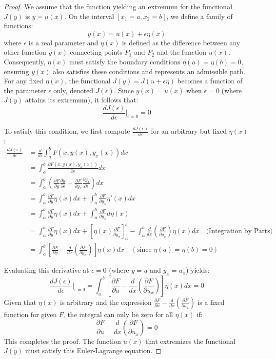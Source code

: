\documentclass[../main.tex]{subfiles}
\begin{document}
\begin{proof}
    
We assume that the function yielding an extremum for the functional $J(y)$ is $y = u(x)$. On the interval $[x_1 = a, x_2 = b]$, we define a family of functions:
$$
y(x) = u(x) + \epsilon \eta(x)
$$
where $\epsilon$ is a real parameter and $\eta(x)$ is defined as the difference between any other function $y(x)$ connecting points $P_1$ and $P_2$ and the function $u(x)$. Consequently, $\eta(x)$ must satisfy the boundary conditions $\eta(a) = \eta(b) = 0$, ensuring $y(x)$ also satisfies these conditions and represents an admissible path. For any fixed $\eta(x)$, the functional $J(y) = J(u + \epsilon\eta)$ becomes a function of the parameter $\epsilon$ only, denoted $J(\epsilon)$. Since $y(x) = u(x)$ when $\epsilon=0$ (where $J(y)$ attains its extremum), it follows that:
$$
\frac{dJ(\epsilon)}{d\epsilon} \bigg|_{\epsilon=0} = 0
$$

To satisfy this condition, we first compute $\frac{dJ(\epsilon)}{d\epsilon}$ for an arbitrary but fixed $\eta(x)$:
\begin{align*}
\frac{dJ(\epsilon)}{d\epsilon} &= \frac{d}{d\epsilon} \int_{a}^{b} F(x, y(x), y_x(x))  dx \\
&= \int_{a}^{b} \frac{\partial F(x, y(x), y_x(x))}{\partial \epsilon}  dx \\
&= \int_{a}^{b} \left( \frac{\partial F}{\partial y} \frac{\partial y}{\partial \epsilon} + \frac{\partial F}{\partial y_x} \frac{\partial y_x}{\partial \epsilon} \right) dx\\
&= \int_{a}^{b} \frac{\partial F}{\partial y} \eta(x)  dx + \int_{a}^{b} \frac{\partial F}{\partial y_x} \eta'(x)  dx \\
&= \int_{a}^{b} \frac{\partial F}{\partial y} \eta(x)  dx + \int_{a}^{b} \frac{\partial F}{\partial y_x}  d\eta(x) \\
&= \int_{a}^{b} \frac{\partial F}{\partial y} \eta(x)  dx + \left[ \eta(x) \frac{\partial F}{\partial y_x} \right]_{a}^{b} - \int_{a}^{b} \frac{d}{dx} \left( \frac{\partial F}{\partial y_x} \right) \eta(x)  dx \quad \text{(Integration by Parts)} \\
&= \int_{a}^{b} \left[ \frac{\partial F}{\partial y} - \frac{d}{dx} \left( \frac{\partial F}{\partial y_x} \right) \right] \eta(x)  dx \quad (\text{since } \eta(a)=\eta(b)=0)
\end{align*}

Evaluating this derivative at $\epsilon=0$ (where $y = u$ and $y_x = u_x$) yields:
$$
\frac{dJ(\epsilon)}{d\epsilon} \bigg|_{\epsilon=0} = \int_{a}^{b} \left[ \frac{\partial F}{\partial u} - \frac{d}{dx} \left( \frac{\partial F}{\partial u_x} \right) \right] \eta(x)  dx = 0
$$
Given that $\eta(x)$ is arbitrary and the expression $\frac{\partial F}{\partial u} - \frac{d}{dx} \left( \frac{\partial F}{\partial u_x} \right)$ is a fixed function for given $F$, the integral can only be zero for all $\eta(x)$ if:
$$
\frac{\partial F}{\partial u} - \frac{d}{dx} \left( \frac{\partial F}{\partial u_x} \right) = 0
$$
This completes the proof. The function $u(x)$ that extremizes the functional $J(y)$ must satisfy this Euler-Lagrange equation.

\end{proof}
\end{document}

